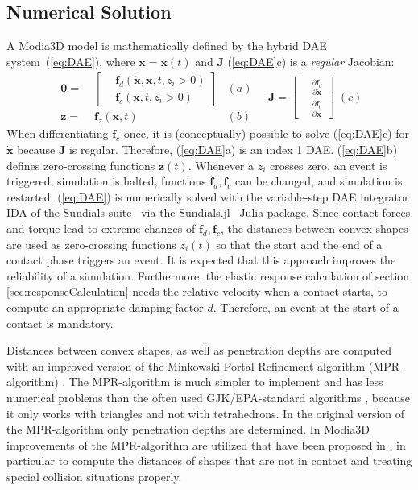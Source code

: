 \subsection{Numerical Solution}

\newcommand{\bvec}[1]{\bm{#1}}

A Modia3D model is mathematically defined by the hybrid DAE system~(\ref{eq:DAE}), 
where $\bvec{x} = \bvec{x}(t)$ 
and $\bvec{J}$ (\ref{eq:DAE}c) is a \emph{regular} Jacobian:
%
\begin{equation} \label{eq:DAE}
\begin{aligned}
\bvec{0} = & \; \left[\begin{aligned}
& \bvec{f}_d(\dot{\bvec{x}},\bvec{x},t, z_i > 0) \\
& \bvec{f}_c(\bvec{x},t, z_i > 0)
\end{aligned}\right]  & (a) \\
\bvec{z} = & \; \bvec{f}_z(\bvec{x},t) & (b)
\end{aligned} \quad
\bvec{J} = \left[\begin{aligned}
& \frac{\partial\bvec{f}_d}{\partial\dot{\bvec{x}}} \\
& \frac{\partial\bvec{f}_c}{\partial{\bvec{x}}}
\end{aligned}\right] \; (c)
\end{equation}
%
When differentiating $\bvec{f}_c$ once, it is (conceptually) possible to
solve (\ref{eq:DAE}c) for $\dot{\bvec{x}}$ because $\bvec{J}$ is regular.
Therefore, (\ref{eq:DAE}a) is an index 1 DAE. (\ref{eq:DAE}b) defines zero-crossing functions $\bvec{z}(t)$. 
Whenever a $z_i$ crosses zero, an event is triggered, simulation is halted, functions
$\bvec{f}_d, \bvec{f}_c$ can be changed, and simulation is restarted. 
(\ref{eq:DAE}) is numerically solved with the variable-step
DAE integrator IDA of the Sundials suite~\cite{Sundials2005} via the
Sundials.jl~\cite{Rackauckas2017} Julia package. Since contact forces and torque
lead to extreme changes of $\bvec{f}_d, \bvec{f}_c$, 
the distances between convex shapes are used as zero-crossing functions $z_i(t)$ so
that the start and the end of a contact phase triggers an event. It is expected that this
approach improves the reliability of a simulation. Furthermore, the elastic response
calculation of section \ref{sec:responseCalculation} needs the relative velocity 
when a contact starts, to compute an appropriate 
damping factor $d$. Therefore, an event at the start of a contact is mandatory.

Distances between convex shapes, as well as penetration depths are computed with an improved version of the
Minkowski Portal Refinement algorithm (MPR-algorithm) \cite{snethen2008}.
The MPR-algorithm is much simpler to implement and has less numerical problems than the often used GJK/EPA-standard algorithms \cite{bergen2003, GJK1988}, because it only works with triangles and not with tetrahedrons.
In the original version of the MPR-algorithm \cite{snethen2008} only penetration depths are determined. In Modia3D improvements of the MPR-algorithm are utilized that have been proposed in \cite{kenwright2015,Neumayr2017}, in particular to compute the distances of shapes that are not in contact
and treating special collision situations properly.

